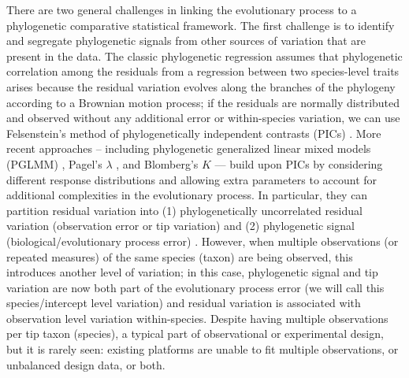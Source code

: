 \documentclass[12pt]{article}
\begin{document}
There are two general challenges in linking the evolutionary process to a phylogenetic comparative statistical framework.
The first challenge is to identify and segregate phylogenetic signals \citep{blomberg2003testing} from other sources of variation that are present in the data.  
The classic phylogenetic regression assumes that phylogenetic correlation among the residuals from a regression between two species-level traits arises because the residual variation evolves along the branches of the phylogeny according to a Brownian motion process; if the residuals are normally distributed and observed without any additional error or within-species variation, we can use Felsenstein's method of phylogenetically independent contrasts (PICs) \citep{felsenstein1985phylogenies, nicolakakis2000forebrain}.
More recent approaches -- including phylogenetic generalized linear mixed models (PGLMM) \citep{ives2011generalized}, Pagel's $\lambda$ \citep{pagel1999inferring}, and Blomberg's $K$ \citep{blomberg2003testing} --- build upon PICs by considering different response distributions and allowing extra parameters to account for additional complexities in the evolutionary process. 
In particular, they can partition residual variation into (1) phylogenetically uncorrelated residual variation (observation error or tip variation) and (2) phylogenetic signal  (biological/evolutionary process error) \citep{hansen2012interpreting}.
However, when multiple observations (or repeated measures) of the same species (taxon) are being observed, this introduces another level of variation; in this case, phylogenetic signal and tip variation are now both part of the evolutionary process error (we will call this species/intercept level variation) and residual variation is associated with observation level variation within-species.
Despite having multiple observations per tip taxon (species), a typical part of observational or experimental design, but it is rarely seen: existing platforms are unable to fit multiple observations, or unbalanced design data, or both.
\end{document}
